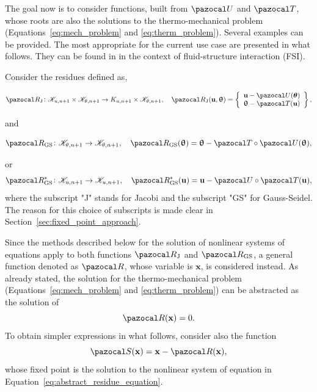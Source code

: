 The goal now is to consider functions, built from \(\pazocal U\) and \(\pazocal T\), whose roots are also the solutions to the thermo-mechanical problem (Equations~\eqref{eq:mech_problem} and \eqref{eq:therm_problem}).
Several examples can be provided.
The most appropriate for the current use case are presented in what follows.
They can be found in \cite{uekermann_partitioned_2016} in the context of fluid-structure interaction (FSI).

Consider the residues defined as,
\begin{highlight}
\begin{equation} \label{eq:def_res_jacobi}
  \pazocal R_\text{J}\colon \mathscr K_{u,n+1}\times\mathscr K_{\theta,n+1} \to K_{u,n+1}\times\mathscr K_{\theta,n+1},\quad  \pazocal R_\text{J}(\mathbf u, \bm \uptheta) =
  \left\{\begin{array}{c}
  \mathbf u - \pazocal U(\bm \theta)\\
  \bm \uptheta - \pazocal T(\mathbf u)
  \end{array}\right\},
\end{equation}
\end{highlight}
and
\begin{highlight}
\begin{equation} \label{eq:def_res_gauss_seidel}
  \pazocal R_\text{GS}\colon \mathscr K_{\theta,n+1} \to\mathscr K_{\theta,n+1},\quad \pazocal R_\text{GS}(\bm \uptheta) =
  \bm \uptheta - \pazocal T\circ \pazocal U(\bm \uptheta),
\end{equation}
\end{highlight}
or
\begin{equation}
  \pazocal R^*_\text{GS}\colon \mathscr K_{u,n+1} \to\mathscr K_{u,n+1},\quad \pazocal R^*_\text{GS}(\mathbf u) =
  \mathbf u - \pazocal U\circ \pazocal T(\mathbf u),
\end{equation}
where the subscript "J" stands for Jacobi and the subscript "GS" for Gauss-Seidel.
The reason for this choice of subscripts is made clear in Section~\ref{sec:fixed_point_approach}.

Since the methods described below for the solution of nonlinear systems of equations apply to both functions \(\pazocal R_\mathrm{J}\) and \(\pazocal R_\mathrm{GS}\), a general function denoted as \(\pazocal R\), whose variable is \(\mathbf x\), is considered instead.
As already stated, the solution for the thermo-mechanical problem (Equations~\eqref{eq:mech_problem} and \eqref{eq:therm_problem}) can be abstracted as the solution of
\begin{equation} \label{eq:abstract_residue_equation}
  \pazocal R(\mathbf x) = 0.
\end{equation}
To obtain simpler expressions in what follows, consider also the function
\begin{equation}
\pazocal S(\mathbf x) = \mathbf x - \pazocal R(\mathbf x),
\end{equation}
whose fixed point is the solution to the nonlinear system of equation in Equation~\eqref{eq:abstract_residue_equation}.

